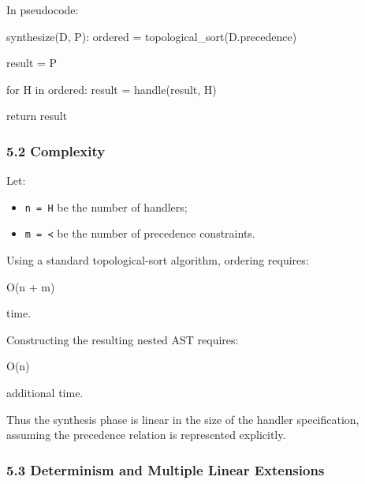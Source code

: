 \documentclass[
  11pt,
]{article}
\newenvironment{Shaded}{}{}
\newcommand{\NormalTok}[1]{#1}
\providecommand{\tightlist}{%
  \setlength{\itemsep}{0pt}\setlength{\parskip}{0pt}}
\begin{document}
In pseudocode:

\begin{Shaded}
\begin{Highlighting}[]
\NormalTok{synthesize(D, P):}
\NormalTok{    ordered = topological\_sort(D.precedence)}

\NormalTok{    result = P}

\NormalTok{    for H in ordered:}
\NormalTok{        result = handle(result, H)}

\NormalTok{    return result}
\end{Highlighting}
\end{Shaded}

\subsubsection{5.2 Complexity}\label{complexity}

Let:

\begin{itemize}
\tightlist
\item
  \texttt{n\ =\ \textbar{}H\textbar{}} be the number of handlers;
\item
  \texttt{m\ =\ \textbar{}≺\textbar{}} be the number of precedence
  constraints.
\end{itemize}

Using a standard topological-sort algorithm, ordering requires:

\begin{Shaded}
\begin{Highlighting}[]
\NormalTok{O(n + m)}
\end{Highlighting}
\end{Shaded}

time.

Constructing the resulting nested AST requires:

\begin{Shaded}
\begin{Highlighting}[]
\NormalTok{O(n)}
\end{Highlighting}
\end{Shaded}

additional time.

Thus the synthesis phase is linear in the size of the handler
specification, assuming the precedence relation is represented
explicitly.

\subsubsection{5.3 Determinism and Multiple Linear
Extensions}\label{determinism-and-multiple-linear-extensions}
\end{document}
